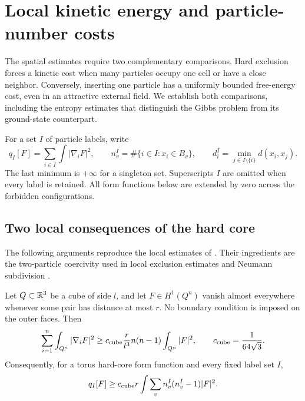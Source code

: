 \section{Local kinetic energy and particle-number costs}\label{sec:energy}

The spatial estimates require two complementary comparisons. Hard exclusion
forces a kinetic cost when many particles occupy one cell or have a close
neighbor. Conversely, inserting one particle has a uniformly bounded
free-energy cost, even in an attractive external field. We establish both
comparisons, including the entropy estimates that distinguish the Gibbs
problem from its ground-state counterpart.

For a set $I$ of particle labels, write
\[
 q_I[F]=\sum_{i\in I}\int|\nabla_iF|^2,\qquad
 n_v^I=\#\{i\in I:x_i\in B_v\},\qquad
 d_i^I=\min_{j\in I\setminus\{i\}}d(x_i,x_j).
\]
The last minimum is $+\infty$ for a singleton set. Superscripts $I$ are
omitted when every label is retained. All form functions below are extended
by zero across the forbidden configurations.

\subsection{Two local consequences of the hard core}

The following arguments reproduce the local estimates of
\citet[Section~3, ``Two local kinetic inequalities'']{HS}. Their ingredients
are the two-particle coercivity used in local exclusion estimates
\citep[Proposition~10]{LundholmPortmannSolovej2015} and Neumann subdivision
\citep{LiebYngvason1998}.

\begin{lemma}\label{lem:cube}
Let $Q\subset\mathbb R^3$ be a cube of side $l$, and let $F\in H^1(Q^n)$
vanish almost everywhere whenever some pair has distance at most $r$.
No boundary condition is imposed on the outer faces. Then
\begin{equation}\label{eq:cube-energy}
 \sum_{i=1}^n\int_{Q^n}|\nabla_iF|^2
 \ge c_{\rm cube}\frac r{l^3}n(n-1)\int_{Q^n}|F|^2,
 \qquad c_{\rm cube}=\frac1{64\sqrt3}.
\end{equation}
Consequently, for a torus hard-core form function and every fixed label
set $I$,
\begin{equation}\label{eq:cell-energy}
 q_I[F]\ge c_{\rm cube}r\int\sum_v n_v^I(n_v^I-1)|F|^2.
\end{equation}
\end{lemma}

